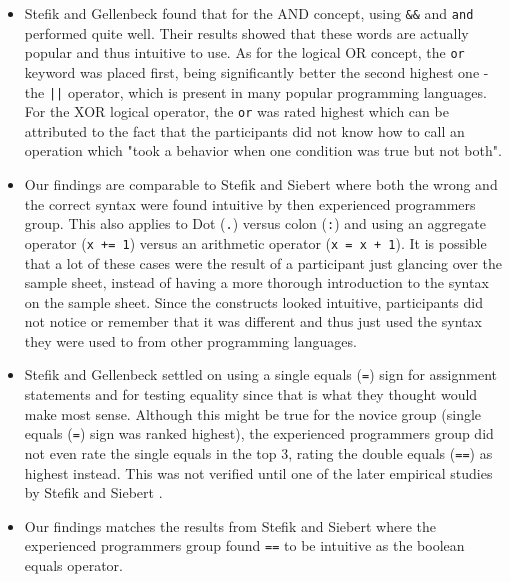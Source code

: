 \documentclass[preprint,10pt]{sigplanconf}
\begin{document}
\begin{itemize}
\item %
Stefik and Gellenbeck \cite{EmpStudiesonStimuli} found that for the AND concept, using \lstinline!&&! and \lstinline!and! performed quite well. Their results showed that these words are actually popular and thus intuitive to use. As for the logical OR concept, the \lstinline!or! keyword was placed first, being significantly better the second highest one - the \lstinline!||! operator, which is present in many popular programming languages. For the XOR logical operator, the \lstinline!or! was rated highest which can be attributed to the fact that the participants did not know how to call an operation which "took a behavior when one condition was true but not both".

\item Our findings are comparable to Stefik and Siebert \cite{Empiricalinvestigation} where both the wrong and the correct syntax were found intuitive by then experienced programmers group. This also applies to Dot (\lstinline!.!) versus colon (\lstinline!:!) and using an aggregate operator (\lstinline!x += 1!) versus an arithmetic operator (\lstinline!x = x + 1!). It is possible that a lot of these cases were the result of a participant just glancing over the sample sheet, instead of having a more thorough introduction to the syntax on the sample sheet. Since the constructs looked intuitive, participants did not notice or remember that it was different and thus just used the syntax they were used to from other programming languages. 

\item Stefik and Gellenbeck \cite{EmpStudiesonStimuli} settled on using a single equals (\lstinline!=!) sign for assignment statements and for testing equality since that is what they thought would make most sense. Although this might be true for the novice group (single equals (\lstinline!=!) sign was ranked highest), the experienced programmers group did not even rate the single equals in the top 3, rating the double equals (\lstinline!==!) as highest instead. This was not verified until one of the later empirical studies by Stefik and Siebert \cite{Empiricalinvestigation}.

\item Our findings matches the results from Stefik and Siebert \cite{Empiricalinvestigation} where the experienced programmers group found \lstinline!==! to be intuitive as the boolean equals operator.


\end{itemize}
\end{document}
